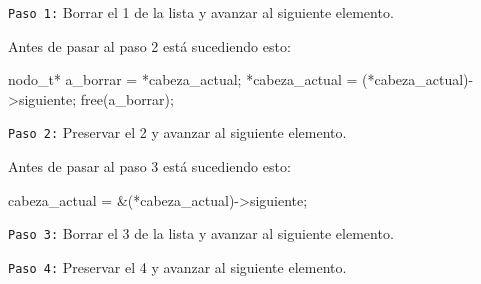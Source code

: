 \documentclass[]{scrartcl}
\begin{document}
\begin{center}
  \noindent {}
\end{center}

\texttt{Paso 1:} Borrar el 1 de la lista y avanzar al siguiente elemento.

\begin{center}
  \noindent {}
\end{center}

Antes de pasar al paso 2 está sucediendo esto:
\begin{bashbox}[minted language=C]
    nodo_t* a_borrar = *cabeza_actual;
    *cabeza_actual = (*cabeza_actual)->siguiente;
    free(a_borrar);
\end{bashbox}

\texttt{Paso 2:} Preservar el 2 y avanzar al siguiente elemento. 

\begin{center}
  \noindent {}
\end{center}

Antes de pasar al paso 3 está sucediendo esto:
\begin{bashbox}[minted language=C]
    cabeza_actual = &(*cabeza_actual)->siguiente;
\end{bashbox}

\texttt{Paso 3:} Borrar el 3 de la lista y avanzar al siguiente elemento.

\begin{center}
  \noindent {}
\end{center}
\texttt{Paso 4:} Preservar el 4 y avanzar al siguiente elemento. 
\end{document}
